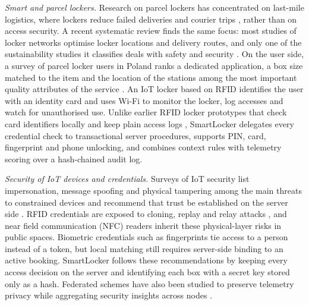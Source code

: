 \documentclass[journal,onecolumn]{IEEEtran}
\begin{document}
\textit{Smart and parcel lockers.} Research on parcel lockers has concentrated on last-mile logistics, where lockers
reduce failed deliveries and courier trips \cite{iwan2016parcel}, rather than on access security. A recent systematic
review finds the same focus: most studies of locker networks optimise locker locations and delivery routes, and only
one of the sustainability studies it classifies deals with safety and security \cite{zhang2025parcel}. On the user
side, a survey of parcel locker users in Poland ranks a dedicated application, a box size matched to the item and the
location of the stations among the most important quality attributes of the service \cite{ciesla2023parcel}. An IoT
locker based on RFID \cite{rfidiot2023locker} identifies the user with an identity card and uses Wi-Fi to monitor the
locker, log accesses and watch for unauthorised use. Unlike earlier RFID locker prototypes that check card identifiers
locally and keep plain access logs \cite{rfidiot2023locker}, SmartLocker delegates every credential check to
transactional server procedures, supports PIN, card, fingerprint and phone unlocking, and combines context rules with
telemetry scoring over a hash-chained audit log.

\textit{Security of IoT devices and credentials.} Surveys of IoT security list impersonation, message spoofing and
physical tampering among the main threats to constrained devices \cite{roman2013features} and recommend that trust be
established on the server side \cite{sicari2015security}. RFID credentials are exposed to cloning, replay and relay
attacks \cite{mitrokotsa2010rfid}, and near field communication (NFC) readers inherit these physical-layer risks in
public spaces. Biometric credentials such as fingerprints tie access to a person instead of a token, but local matching
still requires server-side binding to an active booking. SmartLocker follows these recommendations by keeping every
access decision on the server and identifying each box with a secret key stored only as a hash. Federated schemes have
also been studied to preserve telemetry privacy while aggregating security insights across nodes \cite{shahin2025twostage}.
\end{document}

